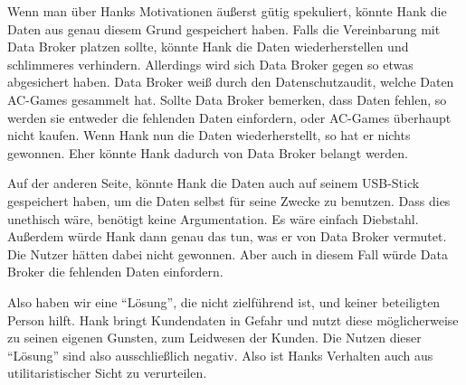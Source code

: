 Wenn man über Hanks Motivationen äußerst gütig spekuliert, könnte Hank die Daten aus genau diesem Grund gespeichert haben.
Falls die Vereinbarung mit Data Broker platzen sollte, könnte Hank die Daten wiederherstellen und schlimmeres verhindern.
Allerdings wird sich Data Broker gegen so etwas abgesichert haben.
Data Broker weiß durch den Datenschutzaudit, welche Daten AC-Games gesammelt hat.
Sollte Data Broker bemerken, dass Daten fehlen, so werden sie entweder die fehlenden Daten einfordern, oder AC-Games überhaupt nicht kaufen.
Wenn Hank nun die Daten wiederherstellt, so hat er nichts gewonnen.
Eher könnte Hank dadurch von Data Broker belangt werden.

Auf der anderen Seite, könnte Hank die Daten auch auf seinem USB-Stick gespeichert haben, um die Daten selbst für seine Zwecke zu benutzen.
Dass dies unethisch wäre, benötigt keine Argumentation. Es wäre einfach Diebstahl.
Außerdem würde Hank dann genau das tun, was er von Data Broker vermutet.
Die Nutzer hätten dabei nicht gewonnen.
Aber auch in diesem Fall würde Data Broker die fehlenden Daten einfordern.

Also haben wir eine \enquote{Lösung}, die nicht zielführend ist, und keiner beteiligten Person hilft. Hank bringt Kundendaten in Gefahr und nutzt diese möglicherweise zu seinen eigenen Gunsten, zum Leidwesen der Kunden.
Die Nutzen dieser \enquote{Lösung} sind also ausschließlich negativ. Also ist Hanks Verhalten auch aus utilitaristischer Sicht zu verurteilen.



